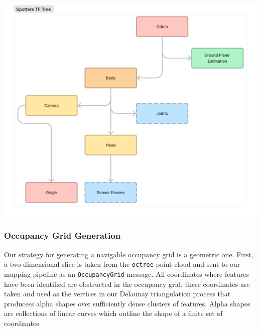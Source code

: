 \documentclass[10pt,english]{article}
\begin{document}
\vspace*{\fill}
\begin{center}
    \includegraphics[width=\textwidth]{images/TFTree.png}
    \linebreak
\end{center}
\vfill
\thispagestyle{empty}

\subsubsection*{Occupancy Grid Generation}

Our strategy for generating a navigable occupancy grid is a geometric one. First, a two-dimensional slice is taken from the \texttt{octree} point cloud and sent to our mapping pipeline as an \texttt{OccupancyGrid} message. All coordinates where features have been identified are obstructed in the occupancy grid; these coordinates are taken and used as the vertices in our Delaunay triangulation process that producess alpha shapes over sufficiently dense clusters of features. Alpha shapes are collections of linear curves which outline the shape of a finite set of coordinates.
\end{document}
